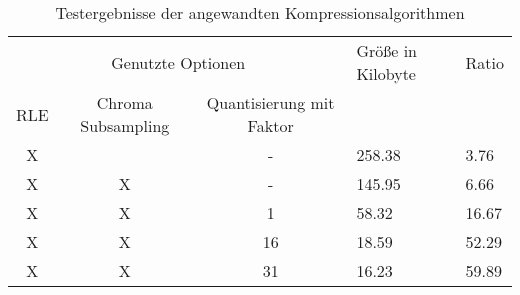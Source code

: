 \begin{table}
\centering
\begin{tabular}{|ccc|l|l|}
	\hline
	\multicolumn{3}{|c|}{Genutzte Optionen}               & Größe in Kilobyte & Ratio \\
	RLE & Chroma Subsampling & Quantisierung mit Faktor &                   &       \\
	\hline
	X   &                    & -                        & 258.38            & 3.76  \\
	X   & X                  & -                        & 145.95            & 6.66  \\
	X   & X                  & 1                        & 58.32             & 16.67 \\
	X   & X                  & 16                       & 18.59             & 52.29 \\
	X   & X                  & 31                       & 16.23             & 59.89 \\
	\hline
\end{tabular}
\caption{Testergebnisse der angewandten Kompressionsalgorithmen}
\label{tab:test}
\end{table}

